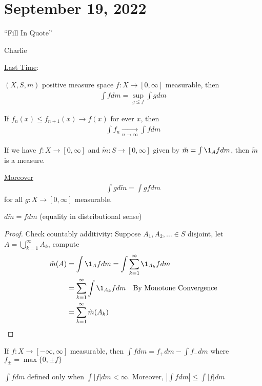 \section{September 19, 2022}

\epigraph{``Fill In Quote''}{Charlie}

\underline{Last Time}:

$(X,S, m)$ positive measure space $f : X \to [0,\infty]$ measurable, then
 \begin{align*}
\int f dm = \sup_{g \leq f} \int g dm
\end{align*}


\begin{theorem}
	If $f_n(x) \leq f_{n+1}(x) \to f(x)$ for ever $x$, then
	\begin{align*}
		\int f_n \xrightarrow[n \to \infty]{} \int f dm
	\end{align*}
\end{theorem}

\begin{corollary}
	If we have $f: X \to [0,\infty]$ and $\tilde{m} : S \to [0,\infty]$ given by $\tilde{m} = \int \1_A fdm$, then $\tilde{m}$ is a measure.

	\underline{Moreover}
	\begin{align*}
		\int g d\tilde{m} = \int g f dm
	\end{align*} for all $g :X \to [0,\infty]$ measurable.

\end{corollary}

\begin{notation}
	$d \tilde{m} = f dm$ (equality in distributional sense)
\end{notation}

\begin{proof}
	Check countably additivity:
	Suppose $A_1, A_2, \ldots \in S$ disjoint, let  $A = \bigcup_{k=1}^{\infty} A_k$, compute
	\begin{align*}
		\tilde{m}(A) &= \int \1_{A} f dm
					 = \int \sum_{k=1}^{\infty} \1_{A_k} f dm \\
					 &= \sum_{k=1}^{\infty} \int \1_{A_k} f dm \quad \text{By Monotone Convergence} \\
					 &=  \sum_{k=1}^{\infty} \tilde{m}( A_k )
	\end{align*}
\end{proof}

\begin{definition}
	If $f: X \to [ - \infty, \infty]$ measurable, then  $\int f dm = f_{+} dm - \int f_{-} dm$ where
	$f_{\pm} = \max\{0, \pm f\}$
\begin{remark}
	$\int f dm$ defined only when $\int |f| dm < \infty$. Moreover,  $|\int f dm | \leq \int |f| dm$
\end{remark}
\end{definition}

